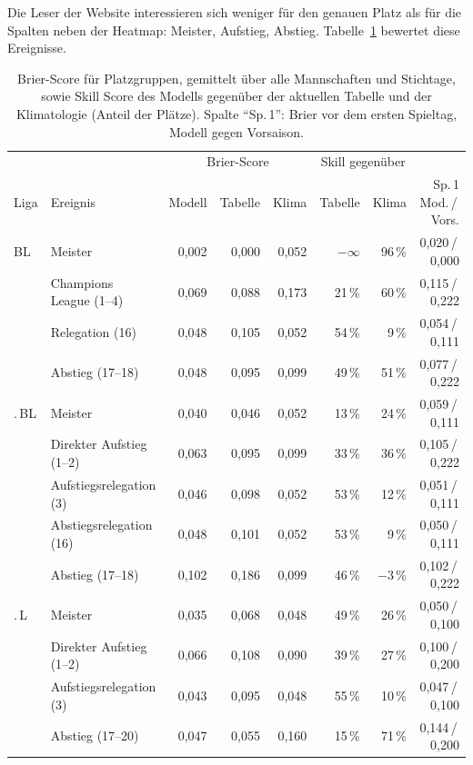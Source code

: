 \documentclass[11pt,a4paper,parskip=half,numbers=noenddot]{scrartcl}
\newcommand{\tab}[1]{Tabelle~\ref{#1}}
\begin{document}
Die Leser der Website interessieren sich weniger für den genauen Platz als
für die Spalten neben der Heatmap: Meister, Aufstieg, Abstieg.
\tab{tab:ereignisse} bewertet diese Ereignisse.

\begin{table}[!htbp]
\centering\footnotesize\setlength{\tabcolsep}{3.5pt}
\caption{Brier-Score für Platzgruppen, gemittelt über alle Mannschaften und
Stichtage, sowie Skill Score des Modells gegenüber der aktuellen Tabelle
und der Klimatologie (Anteil der Plätze). Spalte \enquote{Sp.\,1}: Brier vor
dem ersten Spieltag, Modell gegen Vorsaison.}\label{tab:ereignisse}
\begin{tabular}{@{}ll rrr rr r@{}}
\toprule
& & \multicolumn{3}{c}{Brier-Score} & \multicolumn{2}{c}{Skill gegenüber} & \\
\cmidrule(lr){3-5}\cmidrule(lr){6-7}
Liga & Ereignis & Modell & Tabelle & Klima & Tabelle & Klima & Sp.\,1 Mod.\,/\,Vors. \\
\midrule
BL  & Meister                 & 0,002 & 0,000 & 0,052 & $-\infty$ & 96\,\% & 0,020\,/\,0,000 \\
    & Champions League (1--4) & 0,069 & 0,088 & 0,173 & 21\,\% & 60\,\% & 0,115\,/\,0,222 \\
    & Relegation (16)         & 0,048 & 0,105 & 0,052 & 54\,\% &  9\,\% & 0,054\,/\,0,111 \\
    & Abstieg (17--18)        & 0,048 & 0,095 & 0,099 & 49\,\% & 51\,\% & 0,077\,/\,0,222 \\
\addlinespace
2.\,BL & Meister              & 0,040 & 0,046 & 0,052 & 13\,\% & 24\,\% & 0,059\,/\,0,111 \\
    & Direkter Aufstieg (1--2)& 0,063 & 0,095 & 0,099 & 33\,\% & 36\,\% & 0,105\,/\,0,222 \\
    & Aufstiegsrelegation (3) & 0,046 & 0,098 & 0,052 & 53\,\% & 12\,\% & 0,051\,/\,0,111 \\
    & Abstiegsrelegation (16) & 0,048 & 0,101 & 0,052 & 53\,\% &  9\,\% & 0,050\,/\,0,111 \\
    & Abstieg (17--18)        & 0,102 & 0,186 & 0,099 & 46\,\% & $-3$\,\% & 0,102\,/\,0,222 \\
\addlinespace
3.\,L & Meister               & 0,035 & 0,068 & 0,048 & 49\,\% & 26\,\% & 0,050\,/\,0,100 \\
    & Direkter Aufstieg (1--2)& 0,066 & 0,108 & 0,090 & 39\,\% & 27\,\% & 0,100\,/\,0,200 \\
    & Aufstiegsrelegation (3) & 0,043 & 0,095 & 0,048 & 55\,\% & 10\,\% & 0,047\,/\,0,100 \\
    & Abstieg (17--20)        & 0,047 & 0,055 & 0,160 & 15\,\% & 71\,\% & 0,144\,/\,0,200 \\
\bottomrule
\end{tabular}
\end{table}
\end{document}
